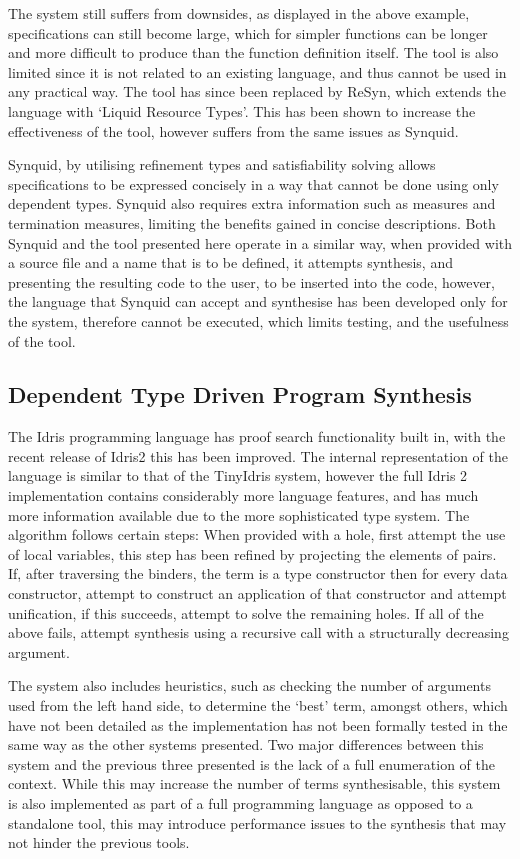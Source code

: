 \documentclass[a4paper]{article}
\begin{document}
The system still suffers from downsides, as displayed in the above example,
specifications can still become large, which for simpler functions can be longer and
more difficult to produce than the function definition itself.
The tool is also limited since it is not related to an existing language, and thus cannot be used in
any practical way. The tool has since been replaced by ReSyn, which extends the language with `Liquid Resource Types'. This has
been shown to increase the effectiveness of the tool, however suffers from the same issues as Synquid.

Synquid, by utilising refinement types and satisfiability solving allows specifications to be expressed concisely in a way that
cannot be done using only dependent types. Synquid also requires extra information such
as measures and termination measures, limiting the benefits gained in concise descriptions. Both Synquid and the tool presented
here operate in a similar way, when provided with a source file and a name that is to be defined, it attempts synthesis, and
presenting the resulting code to the user, to be inserted into the code, however, the language that Synquid can accept and
synthesise has been developed only for the system, therefore cannot be executed, which limits testing, and the usefulness of
the tool.

\subsection{Dependent Type Driven Program Synthesis}
\label{sec:org2385065}
The Idris programming language has proof search functionality built in, with the recent release of Idris2 this has 
been improved. The internal representation of the language is similar to that of the TinyIdris system, 
however the full Idris 2 implementation contains considerably more language features, and has much more information available due to the more sophisticated type system. The algorithm follows certain steps: 
When provided with a hole, first attempt the use of local variables, this step has been refined by projecting the elements of pairs.
If, after traversing the binders, the term is a type constructor then for every data
constructor, attempt to construct an application of that constructor and attempt unification, if this succeeds, attempt
to solve the remaining holes. If all of the above fails, attempt synthesis using a recursive call with a structurally 
decreasing argument. 

The system also includes heuristics, such as checking the number of arguments used from the left hand side, to determine
the `best' term, amongst others, which have not been detailed as the implementation has not been formally tested in the same way as the other systems presented. Two major differences 
between this system and the previous three presented is the lack of a full enumeration of the context. While this may 
increase the number of terms synthesisable, this system is also implemented as part of a full programming language as 
opposed to a standalone tool, this may introduce performance issues to the synthesis that may not hinder the previous 
tools. 
\end{document}
